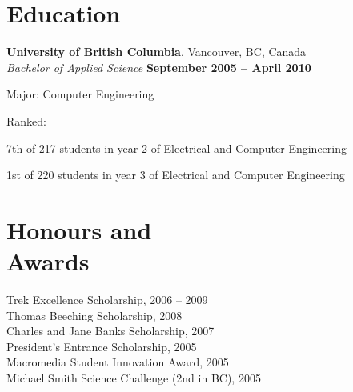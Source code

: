 \documentclass[margin,line]{resume}
\begin{document}
\begin{resume}
    \section{\mysidestyle Education}

    \textbf{University of British Columbia}, Vancouver, BC, Canada
        \vspace{2mm}\\\vspace{1mm}%
    \textsl{Bachelor of Applied Science} \hfill \textbf{September 2005 -- April 2010}
        \vspace{-3mm}\\\vspace{-1mm}%
    \begin{list2}
        \item Major: Computer Engineering
        \item Ranked:
        \begin{list3}
            \item 7th of 217 students in year 2 of Electrical and Computer Engineering
            \item 1st of 220 students in year 3 of Electrical and Computer Engineering
        \end{list3}
    \end{list2}
    \vspace{-1.5mm}

    \section{\mysidestyle Honours and\\Awards} 

    Trek Excellence Scholarship, 2006 -- 2009
        \vspace{1mm}\\%
    Thomas Beeching Scholarship, 2008
        \vspace{1mm}\\%
    Charles and Jane Banks Scholarship, 2007
        \vspace{1mm}\\%
    President's Entrance Scholarship, 2005
        \vspace{1mm}\\%
    Macromedia Student Innovation Award, 2005
        \vspace{1mm}\\%
    Michael Smith Science Challenge (2nd in BC), 2005


\end{resume}
\end{document}
